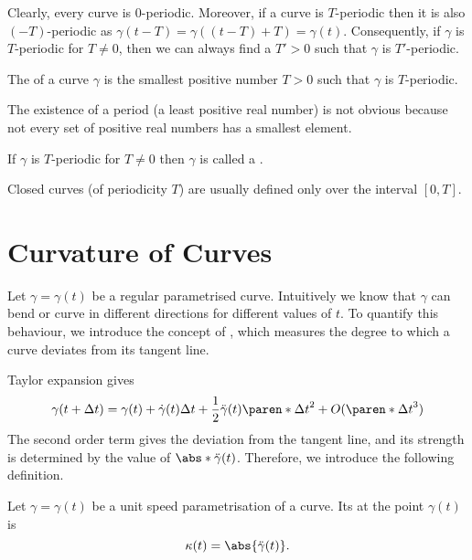 \documentclass[11pt]{penrose}
\begin{document}
Clearly, every curve is $0$-periodic. Moreover, if a curve is $T$-periodic then it is also $(-T)$-periodic as $\gamma(t - T) = \gamma((t-T) + T) = \gamma(t)$. Consequently, if $\gamma$ is $T$-periodic for $T \neq 0$, then we can always find a $T' > 0$ such that $\gamma$ is $T'$-periodic.

\begin{ndfn}
    The  of a curve $\gamma$ is the smallest positive number $T > 0$ such that $\gamma$ is $T$-periodic.
\end{ndfn}

The existence of a period (a least positive real number) is not obvious because not every set of positive real numbers has a smallest element.

\begin{ndfn}
    If $\gamma$ is $T$-periodic for $T \neq 0$ then $\gamma$ is called a .
\end{ndfn}

Closed curves (of periodicity $T$) are usually defined only over the interval $[0, T]$.

\section{Curvature of Curves}
Let $\gamma = \gamma(t)$ be a regular parametrised curve. Intuitively we know that $\gamma$ can bend or curve in different directions for different values of $t$. To quantify this behaviour, we introduce the concept of , which measures the degree to which a curve deviates from its tangent line.

Taylor expansion gives
\begin{equation}
    \gamma(t + \Delta t) = \gamma(t) + \dot{\gamma}(t) \Delta t + \frac{1}{2} \ddot{\gamma}(t) \paren*{\Delta t}^2 + O(\paren*{\Delta t}^3)
\end{equation}
The second order term gives the deviation from the tangent line, and its strength is determined by the value of $\abs*{\ddot{\gamma}(t)}$. Therefore, we introduce the following definition.

\begin{ndfn}
    Let $\gamma = \gamma(t)$ be a unit speed parametrisation of a curve. Its  at the point $\gamma(t)$ is
    \begin{equation}
        \kappa(t) = \abs{\ddot{\gamma}(t)}.
        \label{eq:curvature-dfn}
    \end{equation}
\end{ndfn}
\end{document}
